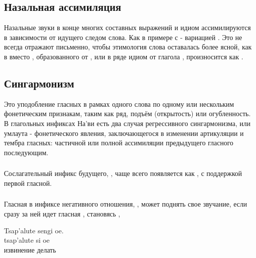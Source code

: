 \subsection{Назальная ассимиляция} Назальные звуки в конце многих составных выражений и идиом ассимилируются в зависимости от идущего следом слова. Как в примере с  - вариацией .  Это не всегда отражают письменно, чтобы этимология слова оставалась более ясной, как в  вместо , образованного от , или в ряде идиом от глагола  ,  произносится как
.  \label{l-and-s:nasalassim}

\subsection{Сингармонизм} Это уподобление гласных в рамках одного слова по одному или нескольким фонетическим признакам, таким как ряд, подъём (открытость) или огубленность.
В глагольных инфиксах На'ви есть два случая регрессивного сингармонизма, или умлаута - фонетического явления, заключающегося в изменении артикуляции и тембра гласных: частичной или полной ассимиляции предыдущего гласного последующим.

\subsubsection{} Сослагательный инфикс будущего, , чаще всего появляется как , с поддержкой первой гласной.

\subsubsection{}\label{l-and-s:eng}
Гласная в инфиксе негативного отношения, , может поднять свое звучание, если сразу за ней идет гласная , становясь ,

\begin{interlin}
\glll Tsap'alute sengi oe. \\
      tsap'alute si oe \\
      извинение делать  \\
\end{interlin}


